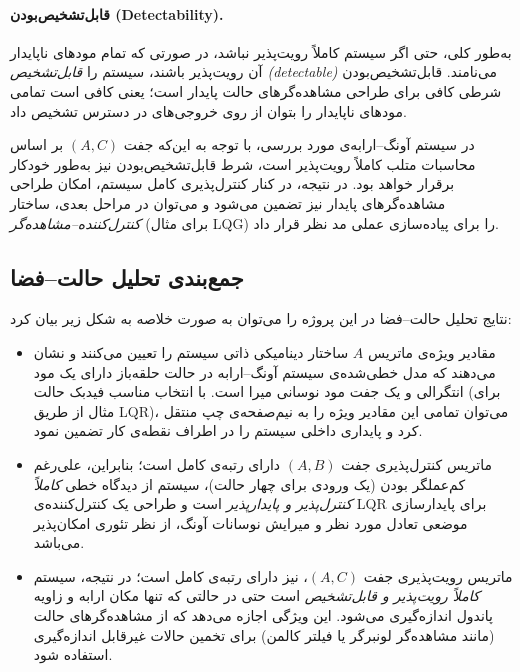 \documentclass[a4paper,12pt]{article}
\begin{document}
\paragraph{قابل‌تشخیص‌بودن (Detectability).}
به‌طور کلی، حتی اگر سیستم کاملاً رویت‌پذیر نباشد،
در صورتی که تمام مودهای ناپایدار آن رویت‌پذیر باشند،
سیستم را \emph{قابل‌تشخیص (detectable)} می‌نامند.
قابل‌تشخیص‌بودن شرطی کافی برای طراحی مشاهده‌گرهای حالت پایدار است؛
یعنی کافی است تمامی مودهای ناپایدار را بتوان از روی خروجی‌های در دسترس تشخیص داد.

در سیستم آونگ--ارابه‌ی مورد بررسی، با توجه به این‌که جفت $(A,C)$
بر اساس محاسبات متلب کاملاً رویت‌پذیر است،
شرط قابل‌تشخیص‌بودن نیز به‌طور خودکار برقرار خواهد بود.
در نتیجه، در کنار کنترل‌پذیری کامل سیستم، امکان طراحی مشاهده‌گرهای پایدار نیز تضمین می‌شود
و می‌توان در مراحل بعدی، ساختار \emph{کنترل‌کننده--مشاهده‌گر} (برای مثال LQG)
را برای پیاده‌سازی عملی مد نظر قرار داد.

\subsection{جمع‌بندی تحلیل حالت--فضا}

نتایج تحلیل حالت--فضا در این پروژه را می‌توان به صورت خلاصه به شکل زیر بیان کرد:
\begin{itemize}
    \item مقادیر ویژه‌ی ماتریس $A$ ساختار دینامیکی ذاتی سیستم را تعیین می‌کنند
          و نشان می‌دهند که مدل خطی‌شده‌ی سیستم آونگ--ارابه
          در حالت حلقه‌باز دارای یک مود انتگرالی و یک جفت مود نوسانی میرا است.
          با انتخاب مناسب فیدبک حالت (برای مثال از طریق LQR)،
          می‌توان تمامی این مقادیر ویژه را به نیم‌صفحه‌ی چپ منتقل کرد
          و پایداری داخلی سیستم را در اطراف نقطه‌ی کار تضمین نمود.
    \item ماتریس کنترل‌پذیری جفت $(A,B)$ دارای رتبه‌ی کامل است؛
          بنابراین، علی‌رغم کم‌عملگر بودن (یک ورودی برای چهار حالت)،
          سیستم از دیدگاه خطی \emph{کاملاً کنترل‌پذیر و پایدارپذیر} است
          و طراحی یک کنترل‌کننده‌ی LQR برای پایدارسازی موضعی تعادل مورد نظر
          و میرایش نوسانات آونگ، از نظر تئوری امکان‌پذیر می‌باشد.
    \item ماتریس رویت‌پذیری جفت $(A,C)$، نیز دارای رتبه‌ی کامل است؛
          در نتیجه، سیستم \emph{کاملاً رویت‌پذیر و قابل‌تشخیص} است حتی در حالتی که تنها مکان ارابه و زاویه پاندول اندازه‌گیری می‌شود.
          این ویژگی اجازه می‌دهد که از مشاهده‌گرهای حالت (مانند مشاهده‌گر لونبرگر
          یا فیلتر کالمن) برای تخمین حالات غیرقابل اندازه‌گیری
          استفاده شود.
\end{itemize}
\end{document}
